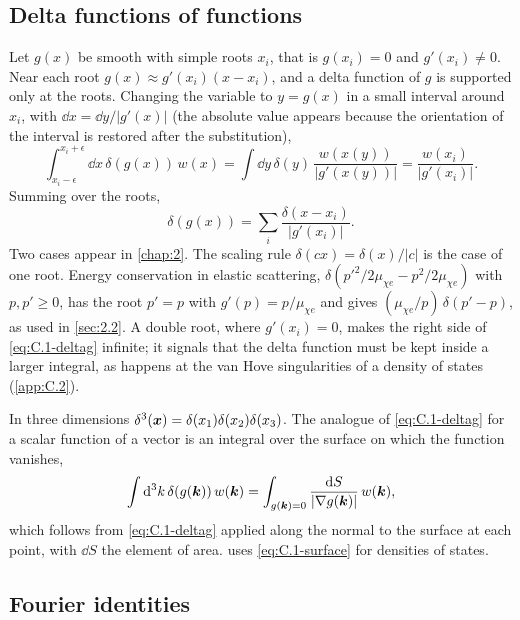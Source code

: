 \subsection{Delta functions of functions}

Let $g(x)$ be smooth with simple roots $x_i$, that is $g(x_i) = 0$ and $g'(x_i) \neq 0$. Near each root $g(x) \approx g'(x_i)(x - x_i)$, and a delta function of $g$ is supported only at the roots. Changing the variable to $y = g(x)$ in a small interval around $x_i$, with $\dd x = \dd y/|g'(x)|$ (the absolute value appears because the orientation of the interval is restored after the substitution),
\begin{equation*}
  \int_{x_i - \epsilon}^{x_i + \epsilon}\dd x\,\delta(g(x))\,w(x) = \int\dd y\,\delta(y)\,\frac{w(x(y))}{|g'(x(y))|} = \frac{w(x_i)}{|g'(x_i)|} .
\end{equation*}
Summing over the roots,
\begin{equation}
  \delta(g(x)) = \sum_i\frac{\delta(x - x_i)}{|g'(x_i)|} .
  \label{eq:C.1-deltag}
\end{equation}
Two cases appear in \cref{chap:2}. The scaling rule $\delta(cx) = \delta(x)/|c|$ is the case of one root. Energy conservation in elastic scattering, $\delta(p'^2/2\mu_{\chi e} - p^2/2\mu_{\chi e})$ with $p, p' \ge 0$, has the root $p' = p$ with $g'(p) = p/\mu_{\chi e}$ and gives $(\mu_{\chi e}/p)\,\delta(p' - p)$, as used in \cref{sec:2.2}. A double root, where $g'(x_i) = 0$, makes the right side of \cref{eq:C.1-deltag} infinite; it signals that the delta function must be kept inside a larger integral, as happens at the van Hove singularities of a density of states (\cref{app:C.2}).

In three dimensions $\delta^3(\bm{x}) = \delta(x_1)\delta(x_2)\delta(x_3)$. The analogue of \cref{eq:C.1-deltag} for a scalar function of a vector is an integral over the surface on which the function vanishes,
\begin{equation}
  \int\mathrm{d}^3k\,\delta(g(\bm{k}))\,w(\bm{k}) = \int_{g(\bm{k}) = 0}\frac{\mathrm{d} S}{|\nabla g(\bm{k})|}\,w(\bm{k}) ,
  \label{eq:C.1-surface}
\end{equation}
which follows from \cref{eq:C.1-deltag} applied along the normal to the surface at each point, with $\dd S$ the element of area.  uses \cref{eq:C.1-surface} for densities of states.

\subsection{Fourier identities}

